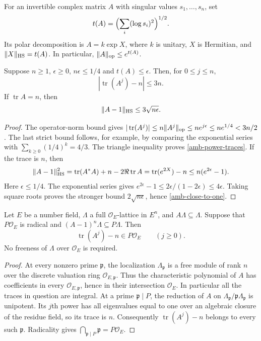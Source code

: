 For an invertible complex matrix $A$ with singular values
$s_1,\ldots,s_n$, set
\[
             t(A)=\Bigl(\sum_i(\log s_i)^2\Bigr)^{1/2}.
\]
Its polar decomposition is $A=k\exp X$, where $k$ is unitary,
$X$ is Hermitian, and $\|X\|_{\rm HS}=t(A)$. In particular,
$\|A\|_{\rm op}\le e^{t(A)}$.

\begin{lemma}\label{amb-archimedean-traces}
Suppose $n\ge1$, $\epsilon\ge0$, $n\epsilon\le1/4$ and
$t(A)\le\epsilon$. Then, for $0\le j\le n$,
\begin{equation}\label{amb-power-traces}
                  |\operatorname{tr}(A^j)-n|\le3n.
\end{equation}
If $\operatorname{tr}A=n$, then
\begin{equation}\label{amb-close-to-one}
                  \|A-1\|_{\rm HS}\le3\sqrt{n\epsilon}.
\end{equation}
\end{lemma}
\begin{proof}
The operator-norm bound gives
$|\operatorname{tr}(A^j)|\le n\|A^j\|_{\rm op}
\le ne^{j\epsilon}\le ne^{1/4}<3n/2$.
The last strict bound follows, for example, by comparing the
exponential series with $\sum_{k\ge0}(1/4)^k=4/3$.
The triangle inequality proves \eqref{amb-power-traces}.
If the trace is $n$, then
\[
 \|A-1\|_{\rm HS}^2
   =\operatorname{tr}(A^*A)+n-2\Re\operatorname{tr}A
   =\operatorname{tr}(e^{2X})-n
   \le n(e^{2\epsilon}-1).
\]
Here $\epsilon\le1/4$. The exponential series gives
$e^{2\epsilon}-1\le2\epsilon/(1-2\epsilon)
\le4\epsilon$. Taking square roots proves the stronger bound
$2\sqrt{n\epsilon}$, hence \eqref{amb-close-to-one}.
\end{proof}

\begin{lemma}\label{amb-integral-traces}
Let $E$ be a number field, $\Lambda$ a full
$\mathcal O_E$-lattice in $E^n$, and $A\Lambda\subseteq\Lambda$.
Suppose that $P\mathcal O_E$ is radical and
$(A-1)^n\Lambda\subseteq P\Lambda$. Then
\[
               \operatorname{tr}(A^j)-n\in P\mathcal O_E
                                      \qquad(j\ge0).
\]
No freeness of $\Lambda$ over $\mathcal O_E$ is required.
\end{lemma}
\begin{proof}
At every nonzero prime $\mathfrak p$, the localization
$\Lambda_{\mathfrak p}$ is a free module of rank $n$ over the
discrete valuation ring $\mathcal O_{E,\mathfrak p}$.
Thus the characteristic polynomial of $A$ has coefficients in
every $\mathcal O_{E,\mathfrak p}$, hence in their intersection
$\mathcal O_E$. In particular all the traces in question are
integral. At a prime $\mathfrak p\mid P$, the reduction of $A$
on $\Lambda_{\mathfrak p}/\mathfrak p\Lambda_{\mathfrak p}$ is
unipotent. Its $j$th power has all eigenvalues equal to one over
an algebraic closure of the residue field, so its trace is $n$.
Consequently $\operatorname{tr}(A^j)-n$ belongs to every such
$\mathfrak p$. Radicality gives
$\bigcap_{\mathfrak p\mid P}\mathfrak p=P\mathcal O_E$.
\end{proof}

